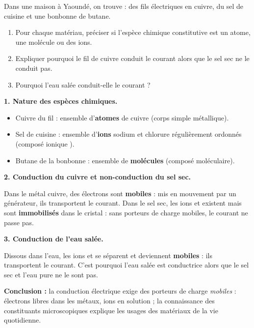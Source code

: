 \documentclass[11pt]{article}
\begin{document}
\begin{exoresolu}
Dans une maison à Yaoundé, on trouve : des fils électriques en cuivre, du sel de cuisine et une bonbonne de butane.
\begin{enumerate}
\item Pour chaque matériau, préciser si l'espèce chimique constitutive est un atome, une molécule ou des ions.
\item Expliquer pourquoi le fil de cuivre conduit le courant alors que le sel sec ne le conduit pas.
\item Pourquoi l'eau salée conduit-elle le courant ?
\end{enumerate}
\tcblower
\textbf{1. Nature des espèces chimiques.}
\begin{itemize}
\item Cuivre du fil : ensemble d'\textbf{atomes} de cuivre  (corps simple métallique).
\item Sel de cuisine : ensemble d'\textbf{ions} sodium  et chlorure  régulièrement ordonnés (composé ionique ).
\item Butane de la bonbonne : ensemble de \textbf{molécules}  (composé moléculaire).
\end{itemize}

\textbf{2. Conduction du cuivre et non-conduction du sel sec.}

Dans le métal cuivre, des électrons sont \textbf{mobiles} : mis en mouvement par un générateur, ils transportent le courant. Dans le sel sec, les ions  et  existent mais sont \textbf{immobilisés} dans le cristal : sans porteurs de charge mobiles, le courant ne passe pas.

\textbf{3. Conduction de l'eau salée.}

Dissous dans l'eau, les ions  et  se séparent et deviennent \textbf{mobiles} : ils transportent le courant. C'est pourquoi l'eau salée est conductrice alors que le sel sec et l'eau pure ne le sont pas.

\textbf{Conclusion :} la conduction électrique exige des porteurs de charge \emph{mobiles} : électrons libres dans les métaux, ions en solution ; la connaissance des constituants microscopiques explique les usages des matériaux de la vie quotidienne.
\end{exoresolu}
\end{document}
